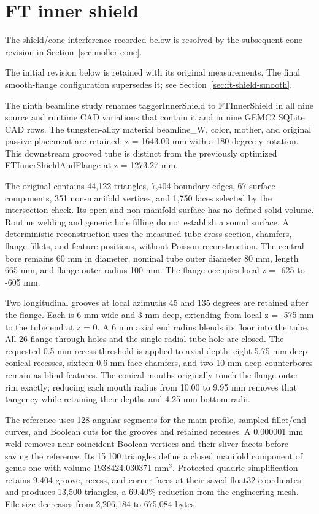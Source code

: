 \FloatBarrier
\section{FT inner shield}
\label{sec:ft-shield}

The shield/cone interference recorded below is resolved by the subsequent cone revision in
Section~\ref{sec:moller-cone}.

The initial revision below is retained with its original measurements. The final smooth-flange configuration
supersedes it; see Section~\ref{sec:ft-shield-smooth}.

The ninth beamline study renames taggerInnerShield to FTInnerShield in all nine source and runtime CAD
variations that contain it and in nine GEMC2 SQLite CAD rows. The tungsten-alloy material beamline\_W,
color, mother, and original passive placement are retained: z = 1643.00 mm with a 180-degree y rotation.
This downstream grooved tube is distinct from the previously optimized FTInnerShieldAndFlange at z = 1273.27
mm.

The original contains 44,122 triangles, 7,404 boundary edges, 67 surface components, 351 non-manifold
vertices, and 1,750 faces selected by the intersection check. Its open and non-manifold surface has no
defined solid volume. Routine welding and generic hole filling do not establish a sound surface. A
deterministic reconstruction uses the measured tube cross-section, chamfers, flange fillets, and feature
positions, without Poisson reconstruction. The central bore remains 60 mm in diameter, nominal tube outer
diameter 80 mm, length 665 mm, and flange outer radius 100 mm. The flange occupies local z = -625 to -605
mm.

Two longitudinal grooves at local azimuths 45 and 135 degrees are retained after the flange. Each is 6 mm
wide and 3 mm deep, extending from local z = -575 mm to the tube end at z = 0. A 6 mm axial end radius
blends its floor into the tube. All 26 flange through-holes and the single radial tube hole are closed. The
requested 0.5 mm recess threshold is applied to axial depth: eight 5.75 mm deep conical recesses, sixteen
0.6 mm face chamfers, and two 10 mm deep counterbores remain as blind features. The conical mouths
originally touch the flange outer rim exactly; reducing each mouth radius from 10.00 to 9.95 mm removes that
tangency while retaining their depths and 4.25 mm bottom radii.

The reference uses 128 angular segments for the main profile, sampled fillet/end curves, and Boolean cuts
for the grooves and retained recesses. A 0.000001 mm weld removes near-coincident Boolean vertices and their
sliver facets before saving the reference. Its 15,100 triangles define a closed manifold component of genus
one with volume 1938424.030371 mm$^3$. Protected quadric simplification retains 9,404 groove, recess, and
corner faces at their saved float32 coordinates and produces 13,500 triangles, a 69.40\% reduction from the
engineering mesh. File size decreases from 2,206,184 to 675,084 bytes.

